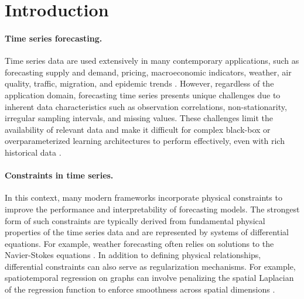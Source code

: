 
\section{Introduction}

\paragraph{Time series forecasting.} Time series data are used extensively in many contemporary applications, such as forecasting supply and demand, pricing, macroeconomic indicators, weather, air quality, traffic, migration, and epidemic trends %
\citep{petropoulos2022forecasting}. 
However, regardless of the application domain, forecasting time series presents unique challenges due to inherent data characteristics such as observation correlations, non-stationarity, irregular sampling intervals, and missing values. These challenges limit the availability of relevant data and make it difficult for complex black-box or overparameterized learning architectures to perform effectively, even with rich historical data %
\citep{lim2021time}. 

\paragraph{Constraints in time series.} In this context, many modern frameworks incorporate physical constraints to improve the performance and interpretability of forecasting models. The strongest form of such constraints are typically derived from fundamental physical properties of the time series data and are represented by systems of differential equations. For example, weather forecasting often relies on solutions to the Navier-Stokes equations \citep[][]{schultz2021can}.
In addition to defining physical relationships, differential constraints can also serve as regularization mechanisms. For example, spatiotemporal regression on graphs can involve penalizing the spatial Laplacian of the regression function to enforce smoothness across spatial dimensions \citep[][]{jin2024spatio}.

